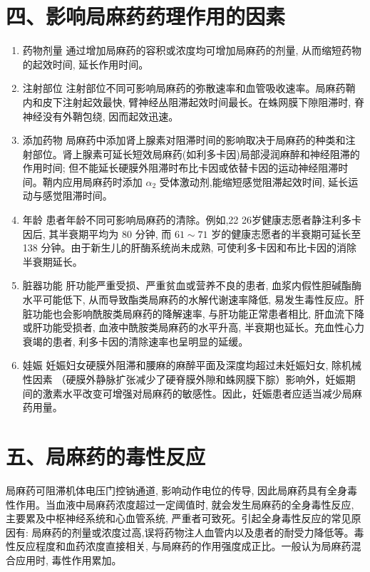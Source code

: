 \documentclass[10pt]{article}
\begin{document}
\section*{四、影响局麻药药理作用的因素}
\begin{enumerate}
  \item 药物剂量 通过增加局麻药的容积或浓度均可增加局麻药的剂量, 从而缩短药物的起效时间, 延长作用时间。

  \item 注射部位 注射部位不同可影响局麻药的弥散速率和血管吸收速率。局麻药鞘内和皮下注射起效最快, 臂神经丛阻滞起效时间最长。在蛛网膜下隙阻滞时, 脊神经没有外鞘包绕, 因而起效迅速。

  \item 添加药物 局麻药中添加肾上腺素对阻滞时间的影响取决于局麻药的种类和注射部位。肾上腺素可延长短效局麻药(如利多卡因)局部浸润麻醉和神经阻滞的作用时间; 但不能延长硬膜外阻滞时布比卡因或依替卡因的运动神经阻滞时间。鞘内应用局麻药时添加 $\alpha_{2}$ 受体激动剂,能缩短感觉阻滞起效时间, 延长运动与感觉阻滞时间。

  \item 年龄 患者年龄不同可影响局麻药的清除。例如,22 26岁健康志愿者静注利多卡因后, 其半衰期平均为 80 分钟, 而 $61 \sim 71$ 岁的健康志愿者的半衰期可延长至 138 分钟。由于新生儿的肝酶系统尚未成熟, 可使利多卡因和布比卡因的消除半衰期延长。

  \item 脏器功能 肝功能严重受损、严重贫血或营养不良的患者, 血浆内假性胆碱酯酶水平可能低下, 从而导致酯类局麻药的水解代谢速率降低, 易发生毒性反应。肝脏功能也会影响酰胺类局麻药的降解速率, 与肝功能正常患者相比, 肝血流下降或肝功能受损者, 血液中酰胺类局麻药的水平升高, 半衰期也延长。充血性心力衰竭的患者, 利多卡因的清除速率也呈明显的延缓。

  \item 娃娠 妊娠妇女硬膜外阻滞和腰麻的麻醉平面及深度均超过未妊娠妇女, 除机械性因素 （硬膜外静脉扩张减少了硬脊膜外隙和蛛网膜下腙）影响外，妊娠期间的激素水平改变可增强对局麻药的敏感性。因此，妊娠患者应适当减少局麻药用量。

\end{enumerate}

\section*{五、局麻药的毒性反应}
局麻药可阻滞机体电压门控钠通道, 影响动作电位的传导, 因此局麻药具有全身毒性作用。当血液中局麻药浓度超过一定阈值时, 就会发生局麻药的全身毒性反应, 主要累及中枢神经系统和心血管系统, 严重者可致死。引起全身毒性反应的常见原因有: 局麻药的剂量或浓度过高,误将药物注人血管内以及患者的耐受力降低等。毒性反应程度和血药浓度直接相关, 与局麻药的作用强度成正比。一般认为局麻药混合应用时, 毒性作用累加。
\end{document}
